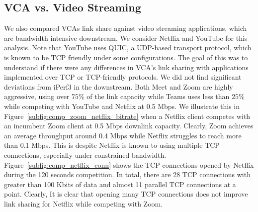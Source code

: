 \subsection{VCA vs. Video Streaming}
We also compared VCAs link share against video streaming applications, which are bandwidth intensive downstream. We consider Netflix and YouTube for this analysis. Note that YouTube uses QUIC, a UDP-based transport protocol, which is known to be TCP friendly under some configurations. The goal of this was to understand if there were any differences in VCA's link sharing with applications implemented over TCP or TCP-friendly protocols. We did not find significant deviations from iPerf3 in the downstream. Both Meet and Zoom are highly aggressive, using over $75\%$ of the link capacity while Teams uses less than $25\%$ while competing with YouTube and Netflix at 0.5 Mbps.
We illustrate this in Figure~\ref{subfig:comp_zoom_netflix_bitrate} when a Netflix client competes with an incumbent Zoom client at 0.5 Mbps downlink capacity. Clearly, Zoom achieves an average throughput around 0.4 Mbps while Netflix struggles to reach more than 0.1 Mbps. This is despite Netflix is known to using multiple TCP connections, especially under constrained bandwidth. Figure~\ref{subfig:comp_netflix_conn} shows the TCP connections opened by Netflix during the 120 seconds competition. In total, there are 28 TCP connections with greater than 100 Kbits of data and almost 11 parallel TCP connections at a point. Clearly, It is clear that opening many TCP connections does not improve link sharing for Netflix while competing with Zoom. 




